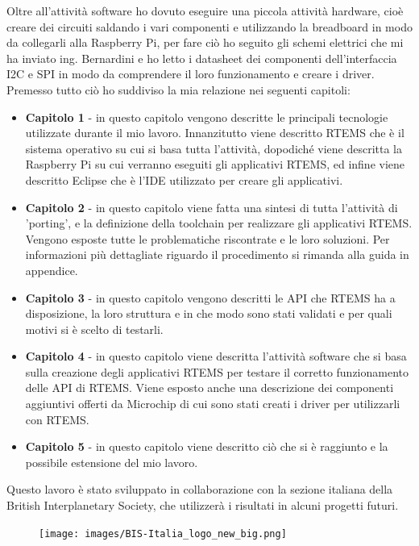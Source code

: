 \documentclass[12pt, a4paper, titlepage, oneside]{book}
\begin{document}
Oltre all'attività software ho dovuto eseguire una piccola attività hardware, cioè creare dei circuiti saldando i vari componenti e utilizzando la breadboard in modo da collegarli alla Raspberry Pi, per fare ciò ho seguito gli schemi elettrici che mi ha inviato ing. Bernardini e ho letto i datasheet dei componenti dell'interfaccia I2C \cite{microchipMCP3425} \cite{microchipADC} e  SPI \cite{microchipMCP4822} \cite{microchipMSOP10-8} in modo da comprendere il loro funzionamento e  creare i driver.
\newpage
Premesso tutto ciò ho suddiviso la mia relazione nei seguenti capitoli:
\begin{itemize}
    \item \textbf{Capitolo 1} - in questo capitolo vengono descritte le principali tecnologie utilizzate durante il mio lavoro. Innanzitutto viene descritto RTEMS che è il sistema operativo su cui si basa tutta l'attività, dopodiché viene  descritta la Raspberry Pi su cui verranno eseguiti gli applicativi RTEMS, ed infine viene descritto Eclipse che è l'IDE utilizzato per creare gli applicativi.
    \item \textbf{Capitolo 2} - in questo capitolo viene fatta una sintesi di tutta l'attività di 'porting', e la definizione della toolchain per realizzare gli applicativi RTEMS. Vengono esposte tutte le problematiche riscontrate e le loro soluzioni.
    Per informazioni più dettagliate riguardo il procedimento si rimanda alla guida in appendice.
    \item \textbf{Capitolo 3} - in questo capitolo vengono descritti le API che RTEMS ha a disposizione, la loro struttura e in che modo sono stati validati e per quali motivi si è scelto di testarli.
    \item \textbf{Capitolo 4} - in questo capitolo viene descritta l'attività software che si basa sulla creazione degli applicativi RTEMS per testare il corretto funzionamento delle API di RTEMS. Viene esposto anche una descrizione dei componenti aggiuntivi offerti da Microchip di cui sono stati creati i driver per utilizzarli con RTEMS.
    \item \textbf{Capitolo 5} - in questo capitolo viene descritto ciò che si è raggiunto e la possibile estensione del mio lavoro.
\end{itemize} 
Questo lavoro è stato sviluppato in collaborazione con la sezione italiana della British Interplanetary Society, che utilizzerà i risultati in alcuni progetti futuri.

\begin{figure}[b]
    \centering
    \texttt{[image: images/BIS-Italia\_logo\_new\_big.png]}
\end{figure}
\end{document}

